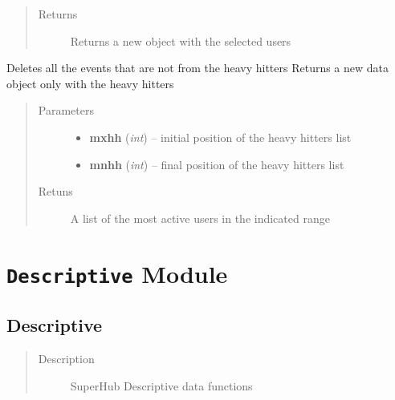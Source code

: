 \documentclass[letterpaper,10pt,english]{sphinxmanual}
\begin{document}
\begin{fulllineitems}
\begin{fulllineitems}
\begin{quote}
\begin{description}
\item[{Returns}] \leavevmode
Returns a new object with the selected users

\end{description}\end{quote}

\end{fulllineitems}


\begin{fulllineitems}
\label{index:SuperHub.STData.STData.select_heavy_hitters}
Deletes all the events that are not from the heavy hitters
Returns a new data object only with the heavy hitters
\begin{quote}\begin{description}
\item[{Parameters}] \leavevmode\begin{itemize}
\item {} 
\textbf{mxhh} (\emph{int}) -- initial position of the heavy hitters list

\item {} 
\textbf{mnhh} (\emph{int}) -- final position of the heavy hitters list

\end{itemize}

\item[{Retuns }] \leavevmode
A list of the most active users in the indicated range

\end{description}\end{quote}

\end{fulllineitems}


\end{fulllineitems}



\chapter{\texttt{Descriptive} Module}
\label{index:module-SuperHub.Descriptive}\label{index:descriptive-module}\label{index:module-Descriptive}

\section{Descriptive}
\label{index:descriptive}\begin{quote}\begin{description}
\item[{Description}] \leavevmode
SuperHub Descriptive data functions

\end{description}\end{quote}
\end{document}
